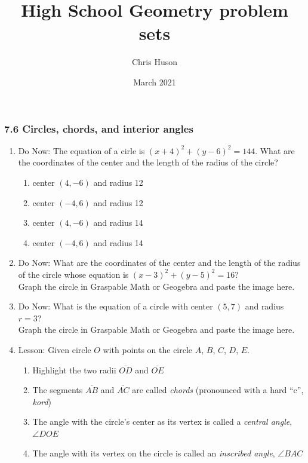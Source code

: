 \documentclass[12pt, twoside]{article}
\title{High School Geometry problem sets}
\author{Chris Huson}
\date{March 2021}
\begin{document}
\subsubsection*{7.6 Circles, chords, and interior angles}
\begin{enumerate}
\item Do Now: The equation of a cirle is $(x+4)^2+(y-6)^2=144$. What are the coordinates of the center and the length of the radius of the circle?
  \begin{enumerate}
    \item center $(4,-6)$ and radius 12
    \item center $(-4,6)$ and radius 12
    \item center $(4,-6)$ and radius 14
    \item center $(-4,6)$ and radius 14
  \end{enumerate}

\newpage
\item Do Now: What are the coordinates of the center and the length of the radius of the circle whose equation is $(x-3)^2+(y-5)^2=16$?\\[0.5cm]
Graph the circle in Graspable Math or Geogebra and paste the image here.
 

\newpage
\item Do Now: What is the equation of a circle with center $(5,7)$ and radius $r=3$?\\[0.5cm]
Graph the circle in Graspable Math or Geogebra and paste the image here.

\newpage
\item Lesson: Given circle $O$ with points on the circle $A$, $B$, $C$, $D$, $E$.
    \begin{multicols}{2}
    \raggedcolumns
    \begin{enumerate}[itemsep=0.5cm]
      \item Highlight the two radii $\overline{OD}$ and $\overline{OE}$
      \item The segments $\overline{AB}$ and $\overline{AC}$ are called \emph{chords} (pronounced with a hard ``c'', \emph{kord})
      \item The angle with the circle's center as its vertex is called a \emph{central angle}, $\angle DOE$
      \item The angle with its vertex on the circle is called an \emph{inscribed angle}, $\angle BAC$
      
    \end{enumerate}
    \end{multicols}


\end{enumerate}
\end{document}
